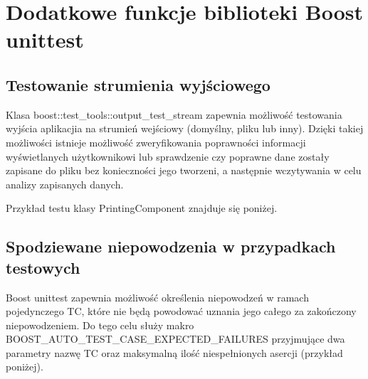 \documentclass[12pt,a4paper,notitlepage]{report}
\begin{document}
\chapter{Dodatkowe funkcje biblioteki Boost unittest}

\section{Testowanie strumienia wyjściowego}

Klasa boost::test{\_}tools::output{\_}test{\_}stream zapewnia możliwość testowania wyjścia aplikacjia na strumień wejściowy (domyślny, pliku lub inny). Dzięki takiej możliwości istnieje możliwość zweryfikowania poprawności informacji wyświetlanych użytkownikowi lub sprawdzenie czy poprawne dane zostały zapisane do pliku bez konieczności jego tworzeni, a następnie wczytywania w celu analizy zapisanych danych.

Przykład testu klasy PrintingComponent znajduje się poniżej.

			

\section{Spodziewane niepowodzenia w przypadkach testowych}

Boost unittest zapewnia możliwość określenia niepowodzeń w ramach pojedynczego TC, które nie będą powodować uznania jego całego za zakończony niepowodzeniem. Do tego celu służy makro BOOST{\_}AUTO{\_}TEST{\_}CASE{\_}EXPECTED{\_}FAILURES przyjmujące dwa parametry nazwę TC oraz maksymalną ilość niespełnionych asercji (przykład poniżej).

			
\end{document}
